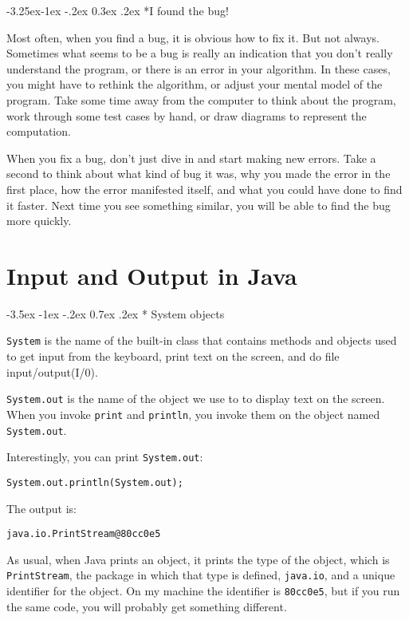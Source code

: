 \documentclass{book}
\makeatletter
\newcounter{exercisenum}
\renewcommand{\section}{\@startsection 
    {section} {1} {0mm}%
    {-3.5ex \@plus -1ex \@minus -.2ex}%
    {0.7ex \@plus.2ex}%
    {\normalfont\Large\bfseries}}
\renewcommand\subsection{\@startsection {subsection}{2}{0mm}%
    {-3.25ex\@plus -1ex \@minus -.2ex}%
    {0.3ex \@plus .2ex}%
    {\normalfont\large\bfseries}}
\newcommand{\clearemptydoublepage}{\newpage{\pagestyle{empty}\cleardoublepage}}
\newcommand{\beforechapter}{
    \cleardoublepage 
    \setcounter{exercisenum}{0}
}
\makeatother
\begin{document}
\subsection*{I found the bug!}

Most often, when you find a bug, it is obvious how to fix it.  But not
always.  Sometimes what seems to be a bug is really an indication that
you don't really understand the program, or there is an error in your
algorithm.  In these cases, you might have to rethink the algorithm,
or adjust your mental model of the program.  Take some time away from
the computer to think about the program, work through some test cases
by hand, or draw diagrams to represent the computation.

When you fix a bug, don't just dive in and start making new errors.
Take a second to think about what kind of bug it was, why you made
the error in the first place, how the error manifested itself, and
what you could have done to find it faster.  Next time you see something
similar, you will be able to find the bug more quickly.



\beforechapter
\chapter{Input and Output in Java}
\label{javaio}

\section* {System objects}
\label{system}

{\tt System} is the name of the built-in class that contains
methods and objects used to get input from the keyboard,
print text on the screen, and do file input/output(I/0).

{\tt System.out} is the name of the object we use to to display text
on the screen.  When you invoke {\tt print} and {\tt println}, you
invoke them on the object named {\tt System.out}.

Interestingly, you can print {\tt System.out}:

\begin{verbatim}
System.out.println(System.out);
\end{verbatim}
%
The output is:

\begin{verbatim}
java.io.PrintStream@80cc0e5
\end{verbatim}
%
As usual, when Java prints an object, it prints the type
of the object, which is {\tt PrintStream}, the package
in which that type is defined, {\tt java.io}, and a
unique identifier for the object.  On my machine the identifier
is {\tt 80cc0e5}, but if you run the same code, you will
probably get something different.
\end{document}
